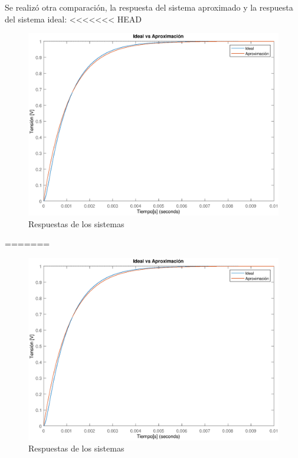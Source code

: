 \documentclass[10pt,a4paper]{article} %
\begin{document}
Se realizó otra comparación, la respuesta del sistema aproximado y la respuesta del sistema ideal:
<<<<<<< HEAD

 \begin{figure}[H]
	\begin{center}
		\includegraphics[scale=0.5]{comp2}
		\caption{Respuestas de los sistemas}
	\end{center}
\end{figure}
=======

 \begin{figure}[H]
	\begin{center}
		\includegraphics[scale=0.5]{comp2}
		\caption{Respuestas de los sistemas}
	\end{center}
\end{figure}
\end{document}
